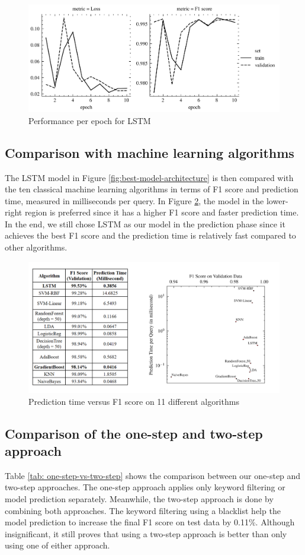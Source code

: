 \begin{figure}[!h]
  \centering
  \includegraphics[width=.5\textwidth]{image/lstm_best_model_performance_per_epoch_without_acc.png}
  \caption{Performance per epoch for LSTM}
  \label{fig:lstm-performance-per-epoch}
\end{figure}

\subsection{Comparison with machine learning algorithms}
\label{subsec:comparison-with-machine-learning}
\par The LSTM model in Figure \ref{fig:best-model-architecture} is then compared with the ten classical machine learning algorithms in terms of F1 score and prediction time, measured in milliseconds per query. In Figure \ref{fig:ml_and_lstm_time_vs_f1}, the model in the lower-right region is preferred since it has a higher F1 score and faster prediction time. In the end, we still chose LSTM as our model in the prediction phase since it achieves the best F1 score and the prediction time is relatively fast compared to other algorithms.

\begin{figure}[!h]
  \centering
  \includegraphics[width=.5 \textwidth]{image/ml-compare.png}
  \caption{Prediction time versus F1 score on 11 different algorithms}
  \label{fig:ml_and_lstm_time_vs_f1}
\end{figure}

\subsection{Comparison of the one-step and two-step approach}
\label{subsec:comparison-two-step}
\par Table \ref{tab: one-step-vs-two-step} shows the comparison between our one-step and two-step approaches. The one-step approach applies only keyword filtering or model prediction separately. Meanwhile, the two-step approach is done by combining both approaches. The keyword filtering using a blacklist help the model prediction to increase the final F1 score on test data by 0.11\%. Although insignificant, it still proves that using a two-step approach is better than only using one of either approach.

